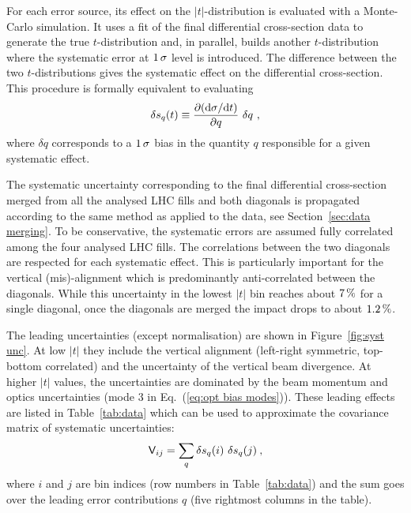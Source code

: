 For each error source, its effect on the $|t|$-distribution is evaluated with a Monte-Carlo simulation. It uses a fit of the final differential cross-section data to generate the true $t$-distribution and, in parallel, builds another $t$-distribution where the systematic error at $1\,{\rm \sigma}$ level is introduced. The difference between the two $t$-distributions gives the systematic effect on the differential cross-section. This procedure is formally equivalent to evaluating
\begin{equation}
\label{eq:syst mode}
\delta s_{q}(t) \equiv \frac{\partial({\rm d}\sigma/{\rm d} t)}{\partial q}\ \delta q\ ,
\end{equation}
where $\delta q$ corresponds to a $1\,{\rm \sigma}$ bias in the quantity $q$ responsible for a given systematic effect.

The systematic uncertainty corresponding to the final differential cross-section merged from all the analysed LHC fills and both diagonals is propagated according to the same method as applied to the data, see Section~\ref{sec:data merging}. To be conservative, the systematic errors are assumed fully correlated among the four analysed LHC fills. The correlations between the two diagonals are respected for each systematic effect. This is particularly important for the vertical (mis)-alignment which is predominantly anti-correlated between the diagonals. While this uncertainty in the lowest $|t|$ bin reaches about $7\,{\rm \%}$ for a single diagonal, once the diagonals are merged the impact drops to about $1.2\,{\rm \%}$.

The leading uncertainties (except normalisation) are shown in Figure~\ref{fig:syst unc}. At low $|t|$ they include the vertical alignment (left-right symmetric, top-bottom correlated) and the uncertainty of the vertical beam divergence. At higher $|t|$ values, the uncertainties are dominated by the beam momentum and optics uncertainties (mode 3 in Eq.~(\ref{eq:opt bias modes})). These leading effects are listed in Table~\ref{tab:data} which can be used to approximate the covariance matrix of systematic uncertainties:
\begin{equation}
\label{eq:covar mat}
\mathsf{V}_{ij} = \sum_{q} \delta s_{q}(i)\ \delta s_{q}(j)\: ,
\end{equation}
where $i$ and $j$ are bin indices (row numbers in Table~\ref{tab:data}) and the sum goes over the leading error contributions $q$ (five rightmost columns in the table).


